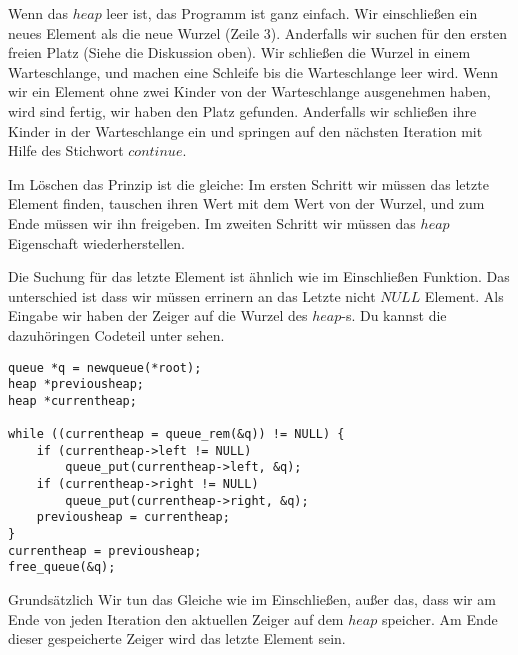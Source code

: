 Wenn das $heap$ leer ist, das Programm ist ganz einfach. Wir einschließen ein neues 
Element als die neue Wurzel (Zeile 3). Anderfalls wir suchen für den ersten freien Platz
(Siehe die Diskussion oben). Wir schließen die Wurzel in einem Warteschlange, und 
machen eine Schleife bis die Warteschlange leer wird. Wenn wir ein Element
ohne zwei Kinder von der Warteschlange ausgenehmen haben, wird sind fertig, wir
haben den Platz gefunden. Anderfalls wir schließen ihre Kinder in der Warteschlange
ein und springen auf den nächsten Iteration mit Hilfe des Stichwort $continue$.

Im Löschen das Prinzip ist die gleiche: Im ersten Schritt wir müssen das letzte Element 
finden, tauschen ihren Wert mit dem Wert von der Wurzel, und zum Ende müssen wir ihn
freigeben. Im zweiten Schritt wir müssen das $heap$ Eigenschaft wiederherstellen.

Die Suchung für das letzte Element ist ähnlich wie im Einschließen Funktion. Das
unterschied ist dass wir müssen errinern an das Letzte nicht $NULL$ Element. Als 
Eingabe wir haben der Zeiger auf die Wurzel des $heap$-s. Du kannst die dazuhöringen
Codeteil unter sehen.
\begin{lstlisting}
queue *q = newqueue(*root);
heap *previousheap;
heap *currentheap;

while ((currentheap = queue_rem(&q)) != NULL) {
    if (currentheap->left != NULL)
        queue_put(currentheap->left, &q);
    if (currentheap->right != NULL)
        queue_put(currentheap->right, &q);
    previousheap = currentheap;
}
currentheap = previousheap;
free_queue(&q);
\end{lstlisting}
Grundsätzlich Wir tun das Gleiche wie im Einschließen, außer das, dass wir am Ende 
von jeden Iteration den aktuellen Zeiger auf dem $heap$ speicher. Am Ende 
dieser gespeicherte Zeiger wird das letzte Element sein. 

